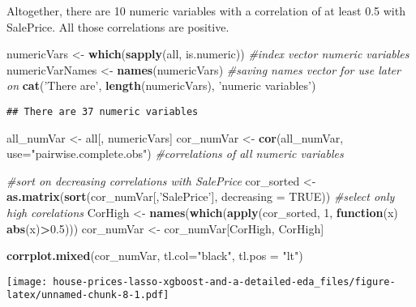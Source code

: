 \documentclass[]{article}
\newenvironment{Shaded}{\begin{snugshade}}{\end{snugshade}}
\newcommand{\CommentTok}[1]{\textcolor[rgb]{0.56,0.35,0.01}{\textit{#1}}}
\newcommand{\ControlFlowTok}[1]{\textcolor[rgb]{0.13,0.29,0.53}{\textbf{#1}}}
\newcommand{\DataTypeTok}[1]{\textcolor[rgb]{0.13,0.29,0.53}{#1}}
\newcommand{\DecValTok}[1]{\textcolor[rgb]{0.00,0.00,0.81}{#1}}
\newcommand{\FloatTok}[1]{\textcolor[rgb]{0.00,0.00,0.81}{#1}}
\newcommand{\KeywordTok}[1]{\textcolor[rgb]{0.13,0.29,0.53}{\textbf{#1}}}
\newcommand{\NormalTok}[1]{#1}
\newcommand{\OperatorTok}[1]{\textcolor[rgb]{0.81,0.36,0.00}{\textbf{#1}}}
\newcommand{\OtherTok}[1]{\textcolor[rgb]{0.56,0.35,0.01}{#1}}
\newcommand{\StringTok}[1]{\textcolor[rgb]{0.31,0.60,0.02}{#1}}
\begin{document}
Altogether, there are 10 numeric variables with a correlation of at
least 0.5 with SalePrice. All those correlations are positive.

\begin{Shaded}
\begin{Highlighting}[]
\NormalTok{numericVars <-}\StringTok{ }\KeywordTok{which}\NormalTok{(}\KeywordTok{sapply}\NormalTok{(all, is.numeric)) }\CommentTok{#index vector numeric variables}
\NormalTok{numericVarNames <-}\StringTok{ }\KeywordTok{names}\NormalTok{(numericVars) }\CommentTok{#saving names vector for use later on}
\KeywordTok{cat}\NormalTok{(}\StringTok{'There are'}\NormalTok{, }\KeywordTok{length}\NormalTok{(numericVars), }\StringTok{'numeric variables'}\NormalTok{)}
\end{Highlighting}
\end{Shaded}

\begin{verbatim}
## There are 37 numeric variables
\end{verbatim}

\begin{Shaded}
\begin{Highlighting}[]
\NormalTok{all_numVar <-}\StringTok{ }\NormalTok{all[, numericVars]}
\NormalTok{cor_numVar <-}\StringTok{ }\KeywordTok{cor}\NormalTok{(all_numVar, }\DataTypeTok{use=}\StringTok{"pairwise.complete.obs"}\NormalTok{) }\CommentTok{#correlations of all numeric variables}

\CommentTok{#sort on decreasing correlations with SalePrice}
\NormalTok{cor_sorted <-}\StringTok{ }\KeywordTok{as.matrix}\NormalTok{(}\KeywordTok{sort}\NormalTok{(cor_numVar[,}\StringTok{'SalePrice'}\NormalTok{], }\DataTypeTok{decreasing =} \OtherTok{TRUE}\NormalTok{))}
 \CommentTok{#select only high corelations}
\NormalTok{CorHigh <-}\StringTok{ }\KeywordTok{names}\NormalTok{(}\KeywordTok{which}\NormalTok{(}\KeywordTok{apply}\NormalTok{(cor_sorted, }\DecValTok{1}\NormalTok{, }\ControlFlowTok{function}\NormalTok{(x) }\KeywordTok{abs}\NormalTok{(x)}\OperatorTok{>}\FloatTok{0.5}\NormalTok{)))}
\NormalTok{cor_numVar <-}\StringTok{ }\NormalTok{cor_numVar[CorHigh, CorHigh]}

\KeywordTok{corrplot.mixed}\NormalTok{(cor_numVar, }\DataTypeTok{tl.col=}\StringTok{"black"}\NormalTok{, }\DataTypeTok{tl.pos =} \StringTok{"lt"}\NormalTok{)}
\end{Highlighting}
\end{Shaded}

\texttt{[image: house-prices-lasso-xgboost-and-a-detailed-eda\_files/figure-latex/unnamed-chunk-8-1.pdf]}
\end{document}
